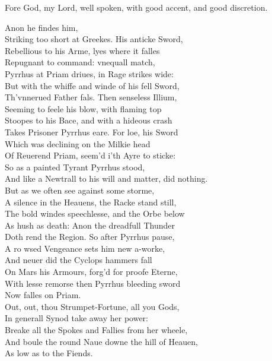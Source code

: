 \documentclass[a5paper,DIV=calc,11pt]{scrbook}
\begin{document}
\begin{drama*}
    \polspeaks Fore God, my Lord, well spoken, with good accent, and good discretion.
    
     Anon he findes him,\\
    Striking too short at Greekes. His anticke Sword,\\
    Rebellious to his Arme, lyes where it falles\\
    Repugnant to command: vnequall match,\\
    Pyrrhus at Priam driues, in Rage strikes wide:\\
    But with the whiffe and winde of his fell Sword,\\
    Th'vnnerued Father fals. Then senseless Illium,\\
    Seeming to feele his blow, with flaming top\\
    Stoopes to his Bace, and with a hideous crash\\
    Takes Prisoner Pyrrhus eare. For loe, his Sword\\
    Which was declining on the Milkie head\\
    Of Reuerend Priam, seem'd i'th Ayre to sticke:\\
    So as a painted Tyrant Pyrrhus stood,\\
    And like a Newtrall to his will and matter, did nothing.\\
    But as we often see against some storme,\\
    A silence in the Heauens, the Racke stand still,\\
    The bold windes speechlesse, and the Orbe below\\
    As hush as death: Anon the dreadfull Thunder\\
    Doth rend the Region. So after Pyrrhus pause,\\
    A ro wsed Vengeance sets him new a-worke,\\
    And neuer did the Cyclops hammers fall\\
    On Mars his Armours, forg'd for proofe Eterne,\\
    With lesse remorse then Pyrrhus bleeding sword\\
    Now falles on Priam.\\
    Out, out, thou Strumpet-Fortune, all you Gods,\\
    In generall Synod take away her power:\\
    Breake all the Spokes and Fallies from her wheele,\\
    And boule the round Naue downe the hill of Heauen,\\
    As low as to the Fiends.
    

\end{drama*}
\end{document}
